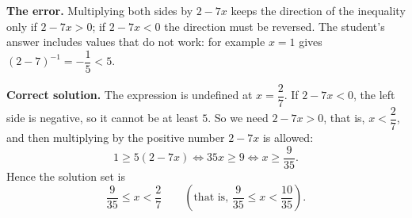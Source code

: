\textbf{The error.} Multiplying both sides by $2-7x$ keeps the direction of the inequality only if $2-7x>0$; if $2-7x<0$ the direction must be reversed. The student's answer includes values that do not work: for example $x=1$ gives $(2-7)^{-1}=-\dfrac{1}{5}<5$.

\textbf{Correct solution.} The expression is undefined at $x=\dfrac{2}{7}$. If $2-7x<0$, the left side is negative, so it cannot be at least $5$. So we need $2-7x>0$, that is, $x<\dfrac{2}{7}$, and then multiplying by the positive number $2-7x$ is allowed:
\[1\ge5(2-7x)\iff35x\ge9\iff x\ge\dfrac{9}{35}.\]
Hence the solution set is
\[\boxed{\dfrac{9}{35}\le x<\dfrac{2}{7}}\qquad\left(\text{that is, } \dfrac{9}{35}\le x<\dfrac{10}{35}\right).\]
